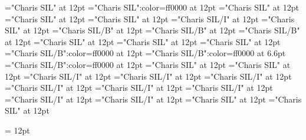 \documentclass[a4paper]{article}
\begin{document}
\pagestyle{plain}
\sloppy
\setlength{\parfillskip}{0pt plus 1fil}
\font\spanen="Charis SIL" at 12pt
\font\spanur="Charis SIL":color=ff0000 at 12pt
\font\diven="Charis SIL" at 12pt
\font\divur="Charis SIL" at 12pt
\font\xitemxitemdefinitionbefore="Charis SIL" at 12pt
\font\xitemxitemexamplebefore="Charis SIL/I" at 12pt
\font\xitemxitemexamplesbefore="Charis SIL" at 12pt
\font\xitemxitemheadwordbefore="Charis SIL/B" at 12pt
\font\xitemxitemheadwordminorbefore="Charis SIL/B" at 12pt
\font\xitemxitemLexEntrypublishRootMinorPrimaryTargetHeadWordRefbefore="Charis SIL/B" at 12pt
\font\xitemxitemlexreftargetsbefore="Charis SIL" at 12pt
\font{}="Charis SIL" at 12pt
\font\entryletDatadicBody="Charis SIL" at 12pt
\font\headwordurentryletDatadicBody="Charis SIL/B":color=ff0000 at 12pt
\font\xhomographnumberheadwordurentryletDatadicBody="Charis SIL/B":color=ff0000 at 6.6pt
\font\spanenheadwordurentryletDatadicBody="Charis SIL/B":color=ff0000 at 12pt
\font\sensesentryletDatadicBody="Charis SIL" at 12pt
\font\sensesensesentryletDatadicBody="Charis SIL" at 12pt
\font\grammaticalinfosensesensesentryletDatadicBody="Charis SIL/I" at 12pt
\font\partofspeechengrammaticalinfosensesensesentryletDatadicBody="Charis SIL/I" at 12pt
\font\spanenpartofspeechengrammaticalinfosensesensesentryletDatadicBody="Charis SIL/I" at 12pt
\font\slotsgrammaticalinfosensesensesentryletDatadicBody="Charis SIL/I" at 12pt
\font\spanenslotsgrammaticalinfosensesensesentryletDatadicBody="Charis SIL/I" at 12pt
\font\slotnameenslotsgrammaticalinfosensesensesentryletDatadicBody="Charis SIL/I" at 12pt
\font\spanenslotnameenslotsgrammaticalinfosensesensesentryletDatadicBody="Charis SIL/I" at 12pt
\font\spanengrammaticalinfosensesensesentryletDatadicBody="Charis SIL/I" at 12pt
\font{}="Charis SIL" at 12pt
\font\spanendefinitionensensesensesentryletDatadicBody="Charis SIL" at 12pt

\newpage 
\thispagestyle{empty} 
\mbox{} 
\newpage 
\newpage 
\setcounter{page}{1} 
\pagestyle{fancy} 
\setlength{\columnsep}{1.5em} 
\setlength\columnseprule{0.4pt} 
\begin{multicols}{2}{\raggedleft} \begin{spacing}{1.5}
\hangindent= 12pt
  \spanenslotsgrammaticalinfosensesensesentryletDatadicBody{: }  \end{spacing}
 \end{multicols}
\end{document}
